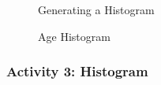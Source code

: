 \begin{figure}[H]
  \begin{center}
    \caption{Generating a Histogram}
    \label{lab02_fig15}
  \end{center}
\end{figure}

\begin{figure}[H]
  \begin{center}
    \caption{Age Histogram}
    \label{lab02_fig16}
  \end{center}
\end{figure}

\subsubsection{Activity 3: Histogram} \label{lab02_act03}


